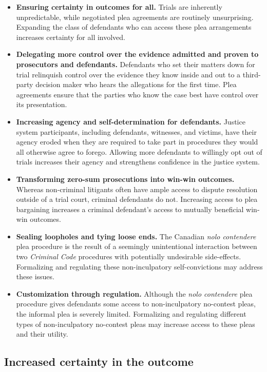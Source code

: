 \begin{itemize}
    \item \textbf{Ensuring certainty in outcomes for all.} Trials are inherently unpredictable, while negotiated plea agreements are routinely unsurprising. Expanding the class of defendants who can access these plea arrangements increases certainty for all involved.
    \item \textbf{Delegating more control over the evidence admitted and proven to prosecutors and defendants.} Defendants who set their matters down for trial relinquish control over the evidence they know inside and out to a third-party decision maker who hears the allegations for the first time. Plea agreements ensure that the parties who know the case best have control over its presentation.
    \item \textbf{Increasing agency and self-determination for defendants.} Justice system participants, including defendants, witnesses, and victims, have their agency eroded when they are required to take part in procedures they would all otherwise agree to forego. Allowing more defendants to willingly opt out of trials increases their agency and strengthens confidence in the justice system.
    \item \textbf{Transforming zero-sum prosecutions into win-win outcomes.} Whereas non-criminal litigants often have ample access to dispute resolution outside of a trial court, criminal defendants do not. Increasing access to plea bargaining increases a criminal defendant's access to mutually beneficial win-win outcomes. 
    \item \textbf{Sealing loopholes and tying loose ends.} The Canadian \textit{nolo contendere} plea procedure is the result of a seemingly unintentional interaction between two \textit{Criminal Code} procedures with potentially undesirable side-effects. Formalizing and regulating these non-inculpatory self-convictions may address these issues.
    \item \textbf{Customization through regulation.} Although the \textit{nolo contendere} plea procedure gives defendants some access to non-inculpatory no-contest pleas, the informal plea is severely limited. Formalizing and regulating different types of non-inculpatory no-contest pleas may increase access to these pleas and their utility.
\end{itemize}

\subsection{Increased certainty in the outcome}

